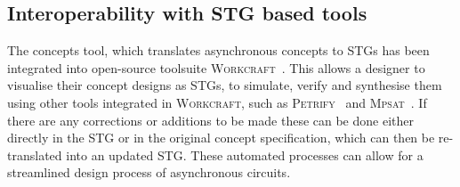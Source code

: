 \documentclass[british,conference,compsoc]{IEEEtran}
\newcommand{\noun}[1]{\textsc{#1}}
\begin{document}
%
%
%


\subsection{Interoperability with STG based tools \label{sub:interop-with-stg}}

%

The concepts tool, which translates asynchronous concepts to STGs has been
integrated into open-source toolsuite \noun{Workcraft}~\cite{Workcraft_website}.
This allows a designer to visualise their concept designs as STGs, to simulate,
verify and synthesise them using other tools integrated in \noun{Workcraft},
such as \noun{Petrify}~\cite{Cortadella} and
\noun{Mpsat}~\cite{khomenko2004detecting}.
If there are any corrections or additions to be made these can be done
either directly in the STG or in the original concept specification, which can then
be re-translated into an updated STG. These automated processes can allow for a
streamlined design process of asynchronous circuits.
\end{document}
